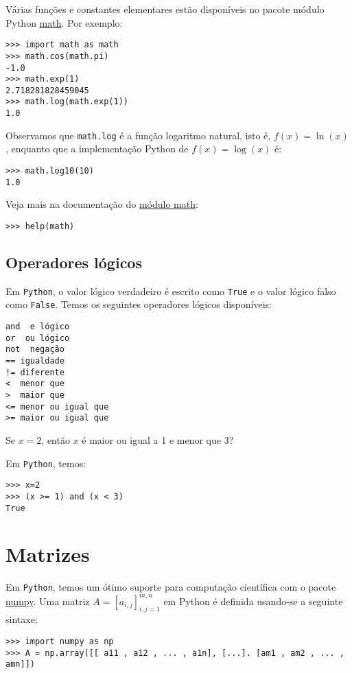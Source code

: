 Várias funções e constantes elementares estão disponíveis no pacote módulo Python \href{https://docs.python.org/3/library/math.html?highlight=math#module-math}{math}. Por exemplo:
\begin{verbatim}
>>> import math as math
>>> math.cos(math.pi)
-1.0
>>> math.exp(1)
2.718281828459045
>>> math.log(math.exp(1))
1.0
\end{verbatim}

Observamos que \verb+math.log+ é a função logaritmo natural, isto é, $f(x) = \ln(x)$, enquanto que a implementação Python de $f(x) = \log(x)$ é:
\begin{verbatim}
>>> math.log10(10)
1.0
\end{verbatim}
Veja mais na documentação do \href{https://docs.python.org/3/library/math.html?highlight=math#module-math}{módulo math}:
\begin{verbatim}
>>> help(math)
\end{verbatim}

\subsection{Operadores lógicos}

Em \verb+Python+, o valor lógico verdadeiro é escrito como \verb+True+ e o valor lógico falso como \verb+False+. Temos os seguintes operadores lógicos disponíveis:
\begin{verbatim}
and  e lógico
or  ou lógico
not  negação
== igualdade
!= diferente
<  menor que
>  maior que
<= menor ou igual que
>= maior ou igual que
\end{verbatim}

\begin{ex}
  Se $x=2$, então $x$ é maior ou igual a 1 e menor que 3?
\end{ex}
\begin{sol}
  Em \verb+Python+, temos:
\begin{verbatim}
>>> x=2
>>> (x >= 1) and (x < 3)
True
\end{verbatim}
\end{sol}

\section{Matrizes}

Em \verb+Python+, temos um ótimo suporte para computação científica com o pacote \href{http://www.numpy.org/}{numpy}. Uma matriz $A = [a_{i,j}]_{i,j=1}^{m,n}$ em Python é definida usando-se a seguinte sintaxe:
\begin{verbatim}
>>> import numpy as np
>>> A = np.array([[ a11 , a12 , ... , a1n], [...]. [am1 , am2 , ... , amn]])
\end{verbatim}

